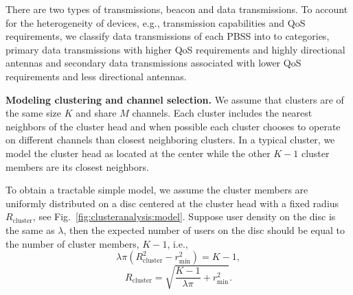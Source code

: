 \documentclass[10pt, conference, letterpaper]{IEEEtran}
\begin{document}
There are two types of transmissions, beacon and data transmissions. 
To account for the heterogeneity of devices, e.g., transmission capabilities and QoS requirements, we classify data transmissions of each PBSS into to categories, primary data transmissions with higher QoS requirements and highly directional antennas and secondary data transmissions associated with lower QoS requirements and less directional antennas.



\textbf{Modeling clustering and channel selection.}
We assume that clusters are of the same size $K$ and share $M$ channels. Each cluster includes the nearest neighbors of the cluster head and when possible each cluster chooses to operate on different channels than closest neighboring clusters.
In a typical cluster, we model the cluster head as located at the center while the other $K-1$ cluster members are its closest neighbors.

To obtain a tractable simple model, we assume the cluster members are uniformly distributed on a disc centered at the cluster head with a fixed radius $R_{\mathrm{cluster}}$, see Fig.~\ref{fig:clusteranalysis:model}. 
Suppose user density on the disc is the same as $\lambda$, then the expected number of users on the disc should be equal to the number of cluster members, $K - 1$, i.e., 
\begin{equation*}
\lambda \pi (R_{\mathrm{cluster}}^2 - r_{\min}^2) = K - 1,
\end{equation*}
\begin{equation*}
R_{\mathrm{cluster}} = \sqrt{\frac{K - 1}{\lambda\pi}+r_{\min}^2}.
\end{equation*}
\end{document}
